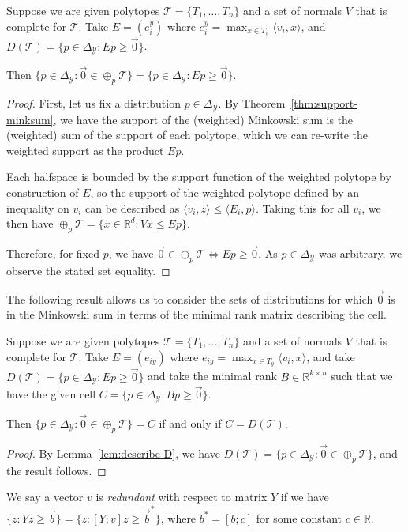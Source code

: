 \documentclass[final]{colt2020} %
\newcommand{\reals}{\mathbb{R}}
\newcommand{\simplex}{\Delta_\Y}
\newcommand{\T}{\mathcal{T}}
\newcommand{\Y}{\mathcal{Y}}
\newcommand{\inprod}[2]{\langle #1, #2 \rangle}%
\begin{document}
\begin{lemma}\label{lem:describe-D}
	Suppose we are given polytopes $\T = \{T_1, \ldots, T_n\}$ and a set of normals $V$ that is complete for $\T$.
	Take $E = (e_{i}^y)$ where $e_{i}^y = \max_{x \in T_y} \inprod{v_i}{x}$, and $D(\T) = \{p \in \simplex : Ep \geq \vec 0\}$.
	
	Then $\{p \in \simplex : \vec 0 \in \oplus_p \T\} = \{p \in \simplex: Ep \geq \vec 0\}$.
\end{lemma}
\begin{proof}
	First, let us fix a distribution $p \in \simplex$.
	By Theorem~\ref{thm:support-minksum}, we have the support of the (weighted) Minkowski sum is the (weighted) sum of the support of each polytope, which we can re-write the weighted support as the product $Ep$.
	
	Each halfspace is bounded by the support function of the weighted polytope by construction of $E$, so the support of the weighted polytope defined by an inequality on $v_i$ can be described as $\inprod{v_i}{z} \leq \inprod{E_i}{p}$.
	Taking this for all $v_i$, we then have $\oplus_p \T = \{x \in \reals^d : Vx \leq Ep\}$.
	
	Therefore, for fixed $p$, we have $\vec 0 \in \oplus_p \T \iff Ep \geq \vec 0$.
	As $p \in \simplex$ was arbitrary, we observe the stated set equality.
\end{proof}


The following result allows us to consider the sets of distributions for which $\vec 0$ is in the Minkowski sum in terms of the minimal rank matrix describing the cell.  

\begin{proposition}\label{prop:relate-E-B}
	Suppose we are given polytopes $\T = \{T_1, \ldots, T_n\}$ and a set of normals $V$ that is complete for $\T$.
	Take $E = (e_{iy})$ where $e_{iy} = \max_{x \in T_y} \inprod{v_i}{x}$, and take $D(\T) = \{p \in \simplex : Ep \geq \vec 0\}$ and take the minimal rank $B \in \reals^{k \times n}$ such that we have the given cell $C = \{p \in \simplex : Bp \geq \vec 0\}$.
	
	Then $\{p \in \simplex : \vec 0 \in \oplus_p \T\} = C$	if and only if $C = D(\T)$.
\end{proposition}
\begin{proof}
	By Lemma~\ref{lem:describe-D}, we have $D(\T) = \{p \in \simplex : \vec 0 \in \oplus_p \T\}$, and the result follows.
\end{proof}

\begin{definition}
	We say a vector $v$ is \emph{redundant} with respect to matrix $Y$ if we have $\{z: Yz \geq \vec b\} = \{z : [Y;v]z \geq \vec b^*\}$, where $b^* = [b;c]$ for some constant $c \in \reals$.
\end{definition}
\end{document}
